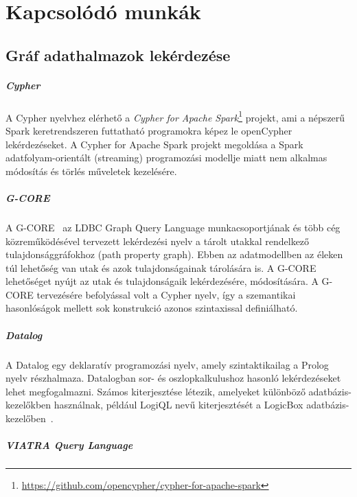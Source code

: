 \chapter{Kapcsolódó munkák}\label{sec:kapcsolodo}

\section{Gráf adathalmazok lekérdezése}
\paragraph{Cypher}
A Cypher nyelvhez elérhető a \emph{Cypher for Apache Spark}\footnote{\url{https://github.com/opencypher/cypher-for-apache-spark}} projekt, ami a népszerű Spark keretrendszeren futtatható programokra képez le openCypher lekérdezéseket. A Cypher for Apache Spark projekt megoldása a Spark adatfolyam-orientált (streaming) programozási modellje miatt nem alkalmas módosítás és törlés műveletek kezelésére.

\paragraph{G-CORE}
A G-CORE~\cite{DBLP:conf/sigmod/AnglesABBFGLPPS18} az LDBC Graph Query Language munkacsoportjának és több cég közreműködésével tervezett lekérdezési nyelv a tárolt utakkal rendelkező tulajdonsággráfokhoz (path property graph). Ebben az adatmodellben az éleken túl lehetőség van utak és azok tulajdonságainak tárolására is. A G-CORE lehetőséget nyújt az utak és tulajdonságaik lekérdezésére, módosítására. A G-CORE tervezésére befolyással volt a Cypher nyelv, így a szemantikai hasonlóságok mellett sok konstrukció azonos szintaxissal definiálható.

\paragraph{Datalog}
A Datalog egy deklaratív programozási nyelv, amely szintaktikailag a Prolog nyelv részhalmaza. Datalogban sor- és oszlopkalkulushoz hasonló lekérdezéseket lehet megfogalmazni. Számos kiterjesztése létezik, amelyeket különböző adatbázis-kezelőkben használnak, például LogiQL nevű kiterjesztését a LogicBox adatbázis-kezelőben~\cite{DBLP:conf/sigmod/ArefCGKOPVW15}.

\paragraph{VIATRA Query Language}

